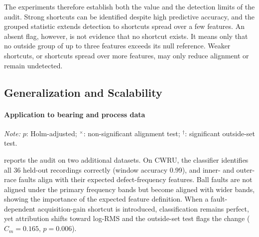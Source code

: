 \documentclass[conference]{IEEEtran}
\begin{document}
The experiments therefore establish both the value and the detection limits of the audit. Strong shortcuts can be identified despite high predictive accuracy, and the grouped statistic extends detection to shortcuts spread over a few features. An absent flag, however, is not evidence that no shortcut exists. It means only that no outside group of up to three features exceeds its null reference. Weaker shortcuts, or shortcuts spread over more features, may only reduce alignment or remain undetected.


\subsection{Generalization and Scalability}

\paragraph{Application to bearing and process data}
\label{sec:cwru}

\begin{table}[t]
\centering
\begin{threeparttable}
\caption{Audit on CWRU bearing data ($K=1{,}000$) and simulated Tennessee Eastman process data ($K=200$).}
\label{tab:cwru}
\footnotesize
\setlength{\tabcolsep}{2.5pt}

\begin{tablenotes}[flushleft]
\footnotesize
\item \textit{Note:} $p$: Holm-adjusted; $^{\times}$: non-significant alignment test; $^{\dagger}$: significant outside-set test.
\end{tablenotes}
\end{threeparttable}
\end{table}

 reports the audit on two additional datasets. On CWRU, the classifier identifies all 36 held-out recordings correctly (window accuracy 0.99), and inner- and outer-race faults align with their expected defect-frequency features. Ball faults are not aligned under the primary frequency bands but become aligned with wider bands, showing the importance of the expected feature definition. When a fault-dependent acquisition-gain shortcut is introduced, classification remains perfect, yet attribution shifts toward log-RMS and the outside-set test flags the change ($C_m=0.165$, $p=0.006$).
\end{document}
